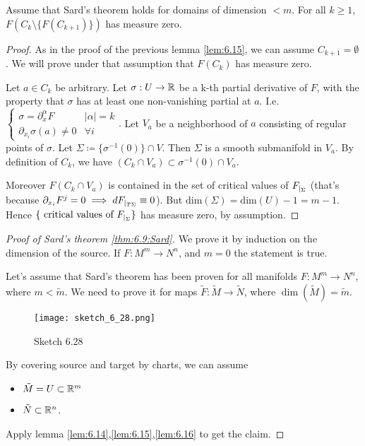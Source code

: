 \begin{lemma}\label{lem:6.16}
    Assume that Sard's theorem holds for domains of dimension \(<m\). For all \(k\geq 1\),
    \(F(C_k\setminus\{F(C_{k+1})\})\) has measure zero.         
\end{lemma}

\begin{proof}
    As in the proof of the previous lemma \ref{lem:6.15}, we can assume \(C_{k+1}=\emptyset\). We will prove 
    under that assumption that \(F(C_k)\) has measure zero.

    Let \(a\in C_k\) be arbitrary. Let \(\sigma:U\to \mathbb{R}\) be a k-th partial derivative of \(F\), with the property that 
    \(\sigma\) has at least one non-vanishing partial at \(a\). I.e. \(\begin{cases}
        \sigma =\partial_x^\alpha F & |\alpha|=k\\
        \partial_{x_i}\sigma(a)\neq 0 &\forall i
    \end{cases}.\) Let \(V_a\) be a neighborhood of \(a\) consisting of regular points of \(\sigma\). Let \(\Sigma\coloneqq \{\sigma^{-1}(0)\}\cap V\). Then \(\Sigma\) is a smooth submanifold in \(V_a\).
    By definition of \(C_k\), we have \((C_k\cap V_a)\subset \sigma^{-1}(0)\cap V_a\).
    
    Moreover \(F(C_k\cap V_a)\) is contained in the set of critical values of \(F_{|_{\Sigma}}\) (that's because \(\partial_{x_i}F^j=0\implies dF_{|_{T\Sigma}}\equiv 0\)).
    But \(\text{dim}(\Sigma)=\text{dim}(U)-1=m-1\). Hence \(\{\text{ critical values of } F_{|_{\Sigma}}\}\) has measure zero, by assumption.
\end{proof}

\begin{proof}[Proof of Sard's theorem \ref{thm:6.9:Sard}]
    We prove it by induction on the dimension of the source. If \(F:M^m\to N^n\), and \(m=0\) the statement is true.

    Let's assume that Sard's theorem has been proven for all manifolds \(F:M^m\to N^n\), where \(m<\tilde{m}\).
    We need to prove it for maps \(\tilde{F}:\tilde{M}\to\tilde{N}\), where \(\dim(\tilde{M})=\tilde{m}\).
    \begin{figure}[H]\label{fig:6.28}
        \centering
        \texttt{[image: sketch\_6\_28.png]}
        \caption{Sketch 6.28}
    \end{figure}
    By covering source and target by charts, we can assume 
    \begin{itemize} %
        \item \(\tilde{M}=U\subset\mathbb{R}^m\)
        \item \(\tilde{N}\subset\mathbb{R}^n\).
    \end{itemize}

    Apply lemma \ref{lem:6.14},\ref{lem:6.15},\ref{lem:6.16} to get the claim. \qedhere

\end{proof}

